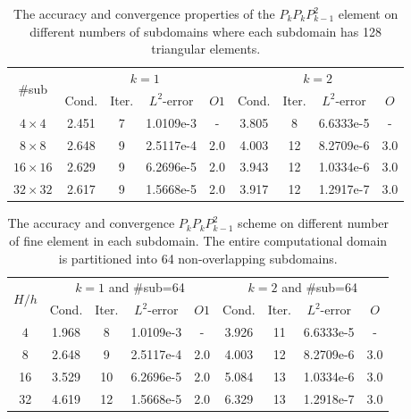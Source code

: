 		
		\begin{table}[H]
			\setlength{\tabcolsep}{1pt} {
				\begin{center}
					\begin{tabular}{c|cccc|cccc}
						\hline
						\multirow{2}{*}{\#sub} &\multicolumn{4}{c|}{$k=1$} &\multicolumn{4}{c}{$k=2$}\\ 
						& Cond.   & Iter. &$L^2$-error & $O1$ & Cond.   & Iter. &$L^2$-error & $O$\\
						\hline
						$4\times 4$ & 2.451 & 7 & 1.0109e-3 & - &3.805 &8 &6.6333e-5  &- \\
						$8\times 8$ &2.648 &9 &2.5117e-4 &	2.0  &4.003 &12 &8.2709e-6  & 3.0 \\
						$16\times 16$ &2.629 &9 &	6.2696e-5 &2.0  &3.943 &12 &1.0334e-6  &3.0\\
						$32\times 32$ &2.617 &9 &1.5668e-5 &2.0  &3.917 &12 &1.2917e-7  &3.0\\
						\hline
					\end{tabular}
					\caption{The accuracy and convergence properties of the $P_{k}P_{k}P_{k-1}^2$ element on different numbers of subdomains where each subdomain has 128 triangular elements.}
					\label{Tab:case1_PkPkPk-1 Row1}
				\end{center} }
			\end{table}
			
			
			\begin{table}[H]
				\setlength{\tabcolsep}{1pt} {
					\begin{center}
						\begin{tabular}{c|cccc|cccc}
							\hline
							\multirow{2}{*}{$H/h$} &\multicolumn{4}{c|}{$k=1$ and \#sub=64}  &\multicolumn{4}{c}{$k=2$ and \#sub=64}\\ 
							& Cond.   & Iter. &$L^2$-error & $O1$ & Cond.   & Iter. &$L^2$-error & $O$\\
							\hline
							$4$ &1.968 &8 &1.0109e-3 &-&3.926 &11 &6.6333e-5  &-\\
							8 &2.648 &9 &2.5117e-4 &2.0 &4.003 &12 &8.2709e-6  &3.0 \\
							16 &3.529 &10 &6.2696e-5 &2.0  &5.084 &13 &1.0334e-6  &3.0\\
							32 &4.619 &12 &1.5668e-5 &2.0  &6.329 &13 &1.2918e-7  &3.0\\
							\hline
						\end{tabular}
					\end{center} }
					\caption{The accuracy and convergence  $P_{k}P_{k}P_{k-1}^2$ scheme on different number of fine element in each subdomain. The entire computational domain is partitioned into 64 non-overlapping subdomains.}
					\label{Tab:case1_PkPkPk-1Row2}
				\end{table}						
				
